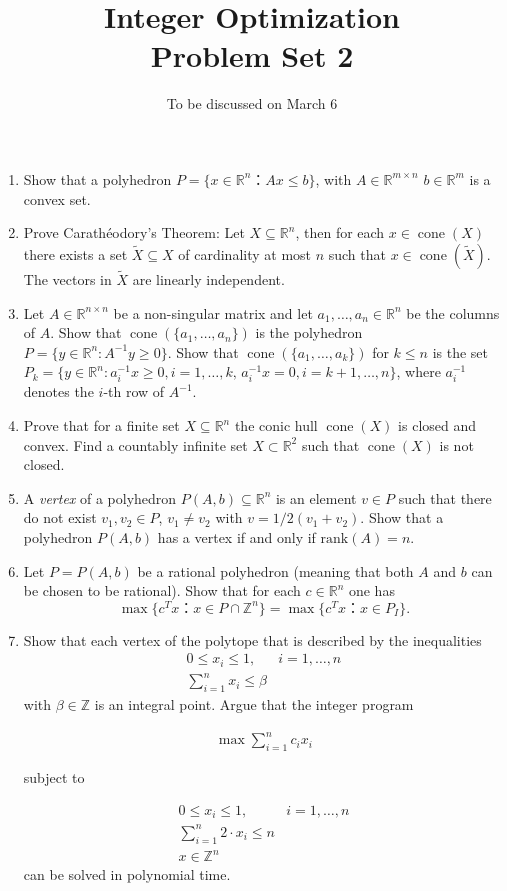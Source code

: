\documentclass[11pt,a4paper]{article}
\title{Integer Optimization  \\ Problem Set 2 }
\date{To be discussed on March 6}
\newcommand{\setR}{\mathbb{R}}
\newcommand{\wt}[1]{\widetilde{#1}}
\renewcommand{\leq}{\leqslant}
\renewcommand{\geq}{\geqslant}
\DeclareMathOperator{\cone}{cone}
\begin{document}
\maketitle 




\begin{enumerate} 
 \item Show that a polyhedron $P = \{ x ∈ ℝ^n ： Ax ≤ b\}$, with $A ∈ ℝ^{m ×n}$ $b∈ ℝ^m$ is a convex set. 
 \item Prove Carath\'eodory's Theorem: Let $X\subseteq\setR^n$, then for each $x \in \cone(X)$ there exists a set
  $\wt{X}\subseteq X$ of cardinality at most $n$  such that $x \in
  \cone(\wt{X})$. The vectors in $\wt{X}$ are linearly independent.
  \item Let $A \in \setR^{n\times n}$ be a non-singular matrix and let
  $a_1,\ldots,a_n\in \setR^n$ be the columns of $A$.  Show that
  $\cone(\{a_1,\ldots,a_n\})$ is the polyhedron $P = \{ y \in \setR^n \colon
  A^{-1} y\geq0\}$. \label{conv:item:3} Show that $\cone(\{a_1,\ldots,a_k\})$ for
  $k\leq n$ is the set $P_k = \{y \in \setR^n \colon
  a_i^{-1} x\geq0, i=1,\ldots,k, \, a_i^{-1}x = 0, i=k+1,\ldots,n\}$, where
  $a_i^{-1}$ denotes the $i$-th row of $A^{-1}$.
\item Prove that for a finite set $X\subseteq\setR^n$ the conic hull $\cone(X)$ is closed  and convex.  Find a countably infinite set $X\subset\setR^2$ such that $\cone(X)$ is not closed.
\item A \emph{vertex} of a polyhedron $P(A,b) ⊆ ℝ^n$  is an element $v ∈ P$ such that there do not exist $v_1, v_2 ∈P$, $v_1 ≠v_2$ with $v = 1/2(v_1+v_2)$. 
  Show that a polyhedron $P(A,b)$ has a vertex if and only if $\mathrm{rank}(A)=n$.
\item Let $P = P(A,b)$ be a rational polyhedron (meaning that both $A$ and $b$ can be chosen to be rational). Show that for each $c ∈ ℝ^n$ one has
  \begin{displaymath}
    \max\{c^Tx ： x ∈ P ∩ℤ^n \}  = \max\{c^Tx ： x ∈ P_I \}. 
  \end{displaymath}
\item Show that each vertex of the polytope that is described by the inequalities
  \begin{eqnarray*}
    0 ≤ x_i ≤ 1, & i=1,\dots, n \\
    ∑_{i=1}^n x_i ≤ β
  \end{eqnarray*}
  with $β ∈ ℤ$ is an integral point. Argue that the integer program

  \begin{eqnarray*}
    \max ∑_{i=1}^n c_i x_i 
  \end{eqnarray*}

  subject to

  \begin{eqnarray*}
    0 ≤ x_i ≤ 1, & i=1,\dots, n \\
    ∑_{i=1}^n 2 ⋅ x_i ≤ n \\
    x ∈ ℤ^n
  \end{eqnarray*}
 can be solved in polynomial time. 
  
\end{enumerate}



%
%


 
\end{document}
